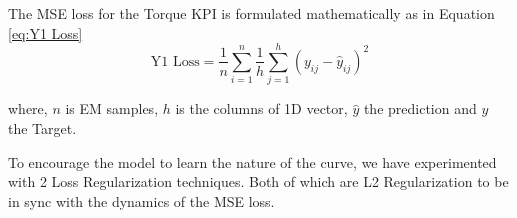 \documentclass{report} %
\begin{document}
The \ac{MSE} loss for the Torque \ac{KPI} is formulated mathematically as in Equation \ref{eq:Y1 Loss}
\begin{equation}
    \text{Y1 Loss} = \frac{1}{n} \sum_{i=1}^{n} \frac{1}{h} \sum_{j=1}^{h} (y_{ij} - \hat{y}_{ij})^2
    \label{eq:Y1 Loss}
\end{equation} 

where, \(n\) is \ac{EM} samples, \(h\) is the columns of 1D vector,  $\hat{y}$ the prediction and \(y\) the Target.

To encourage the model to learn the nature of the curve, we have experimented with 2 Loss Regularization techniques. Both of which are L2 Regularization to be in sync with the dynamics of the \ac{MSE} loss.\\
\end{document}
